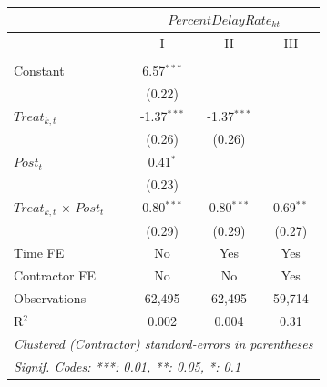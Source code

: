 \documentclass[
]{article}
\begin{document}
\begin{table}[htbp]
   \caption{}
   \centering
   \begin{tabular}{lccc}
      \toprule
      \midrule  & \multicolumn{3}{c}{$PercentDelayRate_{kt}$}\\
      \midrule  & I & II & III\\
      \midrule \\
      Constant                         & 6.57$^{***}$  &               &   \\   
                                       & (0.22)        &               &   \\   
      $Treat_{k,t}$                    & -1.37$^{***}$ & -1.37$^{***}$ &   \\   
                                       & (0.26)        & (0.26)        &   \\   
      $Post_t$                         & 0.41$^{*}$    &               &   \\   
                                       & (0.23)        &               &   \\   
      $Treat_{k,t}$ $\times$ $Post_t$  & 0.80$^{***}$  & 0.80$^{***}$  & 0.69$^{**}$\\   
                                       & (0.29)        & (0.29)        & (0.27)\\   
      \midrule 
      Time FE                          & No            & Yes           & Yes\\  
      Contractor FE                    & No            & No            & Yes\\  
      Observations                     & 62,495        & 62,495        & 59,714\\  
      R$^2$                            & 0.002         & 0.004         & 0.31\\  
      \midrule
      \multicolumn{4}{l}{\emph{Clustered (Contractor) standard-errors in parentheses}}\\
      \multicolumn{4}{l}{\emph{Signif. Codes: ***: 0.01, **: 0.05, *: 0.1}}\\
   \end{tabular}
\end{table}
\end{document}
